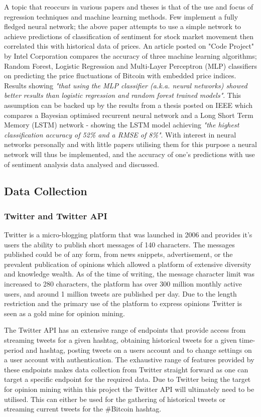 \documentclass[oneside, 12pt]{article}
\begin{document}
		A topic that reoccurs in various papers and theses is that of the use and focus of regression techniques and machine learning methods. Few implement a fully fledged neural network; the above paper attempts to use a simple network to achieve predictions of classification of sentiment for stock market movement then correlated this with historical data of prices. An article posted on "Code Project" by Intel Corporation \cite{StPNSentA} compares the accuracy of three machine learning algorithms; Random Forest, Logistic Regression and Multi-Layer Perceptron (MLP) classifiers on predicting the price fluctuations of Bitcoin with embedded price indices. Results showing \textit{"that using the MLP classifier (a.k.a. neural networks) showed better results than logistic regression and random forest trained models"}. This assumption can be backed up by the results from a thesis posted on IEEE \cite{MLBTCpred} which compares a Bayesian optimised recurrent neural network and a Long Short Term Memory (LSTM) network - showing the LSTM model achieving \textit{"the highest classification accuracy of 52\% and a RMSE of 8\%"}. With interest in neural networks personally and with little papers utilising them for this purpose a neural network will thus be implemented, and the accuracy of one's predictions with use of sentiment analysis data analysed and discussed.
			
		\subsection{Data Collection}\label{tweet_collection}
			
			\subsubsection{Twitter and Twitter API}
			Twitter is a micro-blogging platform that was launched in 2006 and provides it's users the ability to publish short messages of 140 characters. The messages published could be of any form, from news snippets, advertisement, or the prevalent publication of opinions which allowed a platform of extensive diversity and knowledge wealth. As of the time of writing, the message character limit was increased to 280 characters, the platform has over 300 million monthly active users, and around 1 million tweets are published per day. Due to the length restriction and the primary use of the platform to express opinions Twitter is seen as a gold mine for opinion mining.
			
			The Twitter API has an extensive range of endpoints that provide access from streaming tweets for a given hashtag, obtaining historical tweets for a given time-period and hashtag, posting tweets on a users account and to change settings on a user account with authentication. The exhaustive range of features provided by these endpoints makes data collection from Twitter straight forward as one can target a specific endpoint for the required data. Due to Twitter being the target for opinion mining within this project the Twitter API will ultimately need to be utilised. This can either be used for the gathering of historical tweets or streaming current tweets for the \#Bitcoin hashtag.
			
\end{document}
